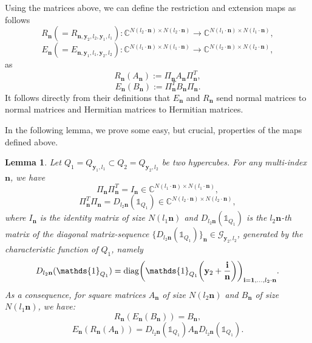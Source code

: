 \documentclass{amsart}
\newtheorem{lem}[thm]{Lemma}
\newcommand{\diag}{\mathop{\mathrm{diag}}}\newcommand{\esssup}{\mathop{\mathrm{ess\,sup}}}\newcommand{\essinf}{\mathop{\mathrm{ess\,inf}}}\newcommand{\e}{\textup{e}}\renewcommand{\i}{\textup{i}}\newcommand{\bfa}{\mathbf a}\newcommand{\bfb}{\mathbf b}\newcommand{\bfc}{\mathbf c}\newcommand{\bfd}{\mathbf d}\newcommand{\bfe}{\mathbf e}\newcommand{\bff}{\mathbf f}\newcommand{\bfg}{\mathbf g}\newcommand{\bfh}{\mathbf h}\newcommand{\bfi}{\mathbf i}\newcommand{\bfj}{\mathbf j}\newcommand{\bfk}{\mathbf k}\newcommand{\bfl}{\mathbf l}\newcommand{\bfm}{\mathbf m}\newcommand{\bfn}{\mathbf n}\newcommand{\bfo}{\mathbf o}\newcommand{\bfp}{\mathbf p}\newcommand{\bfq}{\mathbf q}\newcommand{\bfr}{\mathbf r}\newcommand{\bfs}{\mathbf s}\newcommand{\bft}{\mathbf t}\newcommand{\bfu}{\mathbf u}\newcommand{\bfw}{\mathbf w}\newcommand{\bfv}{\mathbf v}\newcommand{\bfx}{\mathbf x}\newcommand{\bfy}{\mathbf y}\newcommand{\bfz}{\mathbf z}\newcommand{\bfzero}{\mathbf 0}\newcommand{\bfuno}{\mathbf 1}
\begin{document}
Using the matrices above, we can define the restriction and extension maps as follows\\
\begin{equation*}
	R_{\bfn}(=R_{\bfn,\bfy_2,l_2,\bfy_1,l_1}):\mathbb{C}^{N(l_2\cdot \bfn)\times N(l_2\cdot\bfn)}\to\mathbb{C}^{N(l_1\cdot \bfn)\times N(l_1\cdot\bfn)},
\end{equation*}
\begin{equation*}
	E_{\bfn}(=E_{{\bfn, \bfy_1},l_1,{\bfy_2},l_2}):\mathbb{C}^{N(l_1\cdot \bfn)\times N(l_1\cdot\bfn)}\to\mathbb{C}^{N(l_2\cdot \bfn)\times N(l_2\cdot\bfn)},
\end{equation*}
as
\begin{equation*}
	R_{\bfn}(A_{\bfn}):=\Pi_{\bfn}A_{\bfn}\Pi_{\bfn}^T,
\end{equation*}
\begin{equation*}
	E_{\bfn}(B_{\bfn}):=\Pi_{\bfn}^T B_{\bfn}\Pi_{\bfn}.
\end{equation*}
It follows directly from their definitions that $E_{\bfn}$ and $R_{\bfn}$ send normal matrices to normal matrices and Hermitian matrices to Hermitian matrices. 

In the following lemma, we prove some easy, but crucial, properties of the maps defined above.
\begin{lem}\label{lemma_1}
	 Let $Q_1=Q_{{\bfy_1},l_1}\subset Q_2=Q_{{\bfy_2},l_2}$ be two hypercubes. For any multi-index $\bfn$, we have 
	\begin{equation}\label{lemma_1_eq_1}
	 	\Pi_{\bfn}\Pi_{\bfn}^T = I_{\bfn}\in\mathbb{C}^{N(l_1\cdot \bfn)\times N(l_1\cdot\bfn)},
	\end{equation}
	\begin{equation}\label{lemma_1_eq_2}
		\Pi_{\bfn}^T \Pi_{\bfn} = D_{l_2\bfn}(\mathds{1}_{Q_1})\in\mathbb{C}^{N(l_2\cdot \bfn)\times N(l_2\cdot\bfn)},
	\end{equation}
	where $I_{\bfn}$ is the identity matrix of size $N(l_1\bfn)$ and $D_{l_2\bfn}(\mathds{1}_{Q_1})$ is the $l_2\bfn$-th matrix of the diagonal matrix-sequence $\{D_{l_2\bfn}(\mathds{1}_{Q_1})\}_\bfn\in\mathcal{G}_{{\bfy_2},l_2}$, generated by the characteristic function of $Q_1$, namely
	\begin{equation*}
		D_{l_2\bfn}(\mathds{1}_{Q_1})=\diag\biggl(\mathds{1}_{Q_1}\biggl(\bfy_2+\frac{\bfi}{\bfn}\biggr)\biggr)_{{\bfi}={\bf1},\ldots,l_2\cdot\bfn}.
	\end{equation*}
	As a consequence, for square matrices $A_{\bfn}$ of size $N(l_2\bfn)$ and $B_{\bfn}$ of size $N(l_1\bfn)$, we have:
	\begin{equation*}
		R_{\bfn}(E_{\bfn}(B_{\bfn}))=B_{\bfn},
	\end{equation*}
	\begin{equation*}
		E_{\bfn}(R_{\bfn}(A_{\bfn}))=D_{l_2\bfn}(\mathds{1}_{Q_1})A_{\bfn}D_{l_2\bfn}(\mathds{1}_{Q_1}).
	\end{equation*}

\end{lem}
\end{document}
